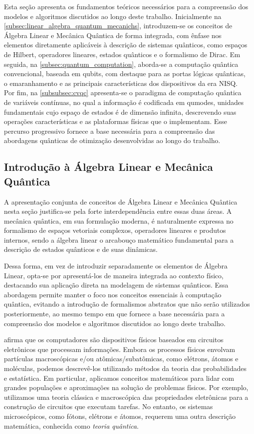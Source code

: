 Esta seção apresenta os fundamentos teóricos necessários para a compreensão dos modelos e algoritmos discutidos ao longo deste trabalho. Inicialmente na \autoref{subsec:linear_algebra_quantum_mecanichs}, introduzem-se os conceitos de Álgebra Linear e Mecânica Quântica de forma integrada, com ênfase nos elementos diretamente aplicáveis à descrição de sistemas quânticos, como espaços de Hilbert, operadores lineares, estados quânticos e o formalismo de Dirac. Em seguida, na \autoref{subsec:quantum_computation}, aborda-se a computação quântica convencional, baseada em qubits, com destaque para as portas lógicas quânticas, o emaranhamento e as principais características dos dispositivos da era NISQ. Por fim, na \autoref{subsubsec:cvqc} apresenta-se o paradigma de computação quântica de variáveis contínuas, no qual a informação é codificada em qumodes, unidades fundamentais cujo espaço de estados é de dimensão infinita, descrevendo suas operações características e as plataformas físicas que o implementam. Esse percurso progressivo fornece a base necessária para a compreensão das abordagens quânticas de otimização desenvolvidas ao longo do trabalho.



\subsection{Introdução à Álgebra Linear e Mecânica Quântica}\label{subsec:linear_algebra_quantum_mecanichs}

A apresentação conjunta de conceitos de Álgebra Linear e Mecânica Quântica nesta seção justifica-se pela forte interdependência entre essas duas áreas. A mecânica quântica, em sua formulação moderna, é naturalmente expressa no formalismo de espaços vetoriais complexos, operadores lineares e produtos internos, sendo a álgebra linear o arcabouço matemático fundamental para a descrição de estados quânticos e de suas dinâmicas.

Dessa forma, em vez de introduzir separadamente os elementos de Álgebra Linear, opta-se por apresentá-los de maneira integrada ao contexto físico, destacando sua aplicação direta na modelagem de sistemas quânticos. Essa abordagem permite manter o foco nos conceitos essenciais à computação quântica, evitando a introdução de formalismos abstratos que não serão utilizados posteriormente, ao mesmo tempo em que fornece a base necessária para a compreensão dos modelos e algoritmos discutidos ao longo deste trabalho.

\textcite{Schuld2021} afirma que os computadores são dispositivos físicos baseados em circuitos eletrônicos que processam informações. Embora os processos físicos envolvam partículas macroscópicas e/ou atômicas/subatômicas, como elétrons, átomos e moléculas, podemos descrevê-los utilizando métodos da teoria das probabilidades e estatística. Em particular, aplicamos conceitos matemáticos para lidar com grandes populações e aproximações na solução de problemas físicos. Por exemplo, utilizamos uma teoria clássica e macroscópica das propriedades eletrônicas para a construção de circuitos que executam tarefas. No entanto, os sistemas microscópicos, como fótons, elétrons e átomos, requerem uma outra descrição matemática, conhecida como \textit{teoria quântica}.


